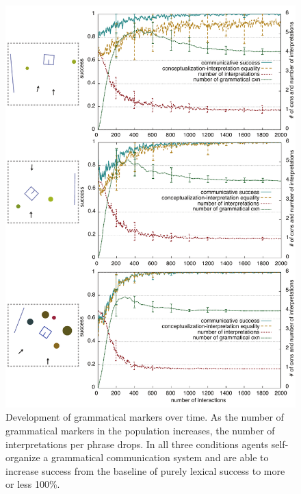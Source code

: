 \begin{figure}
\includegraphics[width=0.9\columnwidth]{figs/why-grammar-development}
\caption[Development of grammatical markers over time]{Development of grammatical markers over time. As the number of 
grammatical markers in the population
increases, the number of interpretations per phrase drops. In all three
conditions agents self-organize a grammatical communication system and
are able to increase success from the baseline of purely lexical success 
to more or less 100\%.}
\label{f:why-grammar-development}
\end{figure}

